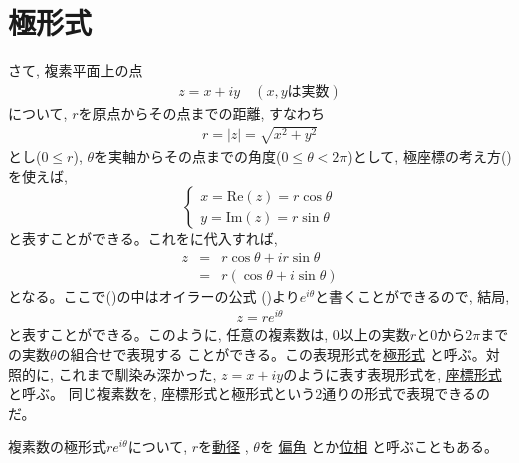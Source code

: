 \section{極形式}
さて, 複素平面上の点
\begin{eqnarray}z=x+iy\,\,\,\,\,\,(x, y\text{は実数})\label{eq:def_comp_z_0}\end{eqnarray}
について, $r$を原点からその点までの距離, すなわち
\begin{eqnarray}r=|z|=\sqrt{x^2+y^2}\label{eq:compnum_r}\end{eqnarray}
とし($0\le r$), $\theta$を実軸からその点までの角度($0\le\theta<2\pi$)として, 
極座標の考え方()を使えば, 
\begin{equation}\begin{cases}
x = \text{Re}(z)=r \cos \theta\\
y = \text{Im}(z)=r \sin \theta
\end{cases}\label{eq:compnum_x_y_r_theta}\end{equation}
と表すことができる。これをに代入すれば, 
\begin{eqnarray}
z&=&r\cos\theta+ir\sin\theta\nonumber\\
 &=&r(\cos\theta+i\sin\theta)
\end{eqnarray}
となる。ここで()の中はオイラーの公式
()より$e^{i\theta}$と書くことができるので, 結局, 
\begin{eqnarray}
z=re^{i\theta}\label{eq:comppolar}
\end{eqnarray}
と表すことができる。このように, 任意の複素数は, 0以上の実数$r$と0から$2\pi$までの実数$\theta$の組合せで表現する
ことができる。この表現形式を\underline{極形式} と呼ぶ。対照的に, 
これまで馴染み深かった, $z=x+iy$のように表す表現形式を, \underline{座標形式}と呼ぶ。
同じ複素数を, 座標形式と極形式という2通りの形式で表現できるのだ。\mv

複素数の極形式$re^{i\theta}$について, $r$を\underline{動径} , $\theta$を
\underline{偏角} とか\underline{位相} と呼ぶこともある。

